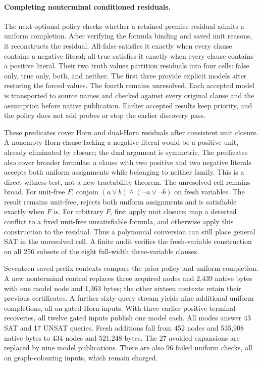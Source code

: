 \documentclass[11pt,a4paper]{article}
\numberwithin{equation}{section}
\theoremstyle{plain}
\theoremstyle{definition}
\theoremstyle{remark}
\begin{document}
\paragraph{Completing nonterminal conditioned residuals.}
The next optional policy checks whether a retained premise residual admits a
uniform completion. After verifying the formula binding and saved unit reasons,
it reconstructs the residual. All-false satisfies it exactly when every clause
contains a negative literal; all-true satisfies it exactly when every clause
contains a positive literal. Their two truth values partition residuals into
four cells: false only, true only, both, and neither. The first three provide
explicit models after restoring the forced values. The fourth remains
unresolved. Each accepted model is transported to source names and checked
against every original clause and the assumption before native publication.
Earlier accepted results keep priority, and the policy does not add probes or
stop the earlier discovery pass.

These predicates cover Horn and dual-Horn residuals after consistent unit
closure. A nonempty Horn clause lacking a negative literal would be a positive
unit, already eliminated by closure; the dual argument is symmetric. The
predicates also cover broader formulas: a clause with two positive and two
negative literals accepts both uniform assignments while belonging to neither
family. This is a direct witness test, not a new tractability theorem.
The unresolved cell remains broad. For unit-free $F$, conjoin
$(a\lor b)\land(\neg a\lor\neg b)$ on fresh variables. The result remains
unit-free, rejects both uniform assignments and is satisfiable exactly when
$F$ is. For arbitrary $F$, first apply unit closure; map a detected conflict
to a fixed unit-free unsatisfiable formula, and otherwise apply this construction
to the residual. Thus a polynomial conversion can still place general SAT in
the unresolved cell. A finite audit verifies the fresh-variable construction
on all 256 subsets of the eight full-width three-variable clauses.

Seventeen saved-prefix contexts compare the prior policy and uniform
completion. A new nonterminal control replaces three acquired nodes and 2,439
native bytes with one model node and 1,363 bytes; the other sixteen contexts
retain their previous certificates. A further sixty-query stream yields nine
additional uniform completions, all on gated-Horn inputs. With three earlier
positive-terminal recoveries, all twelve gated inputs publish one model each.
All modes answer 43 SAT and 17 UNSAT queries. Fresh additions fall from 452
nodes and 535,908 native bytes to 434 nodes and 521,248 bytes. The 27 avoided
expansions are replaced by nine model publications. There are also 96 failed
uniform checks, all on graph-colouring inputs, which remain charged.
\end{document}
